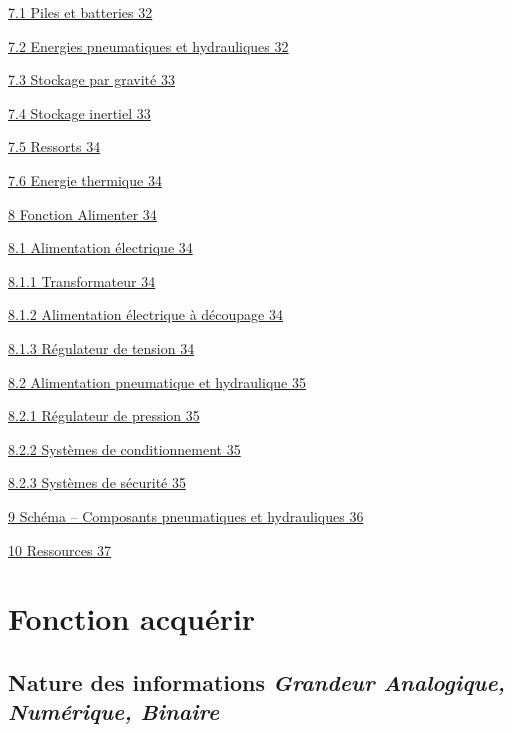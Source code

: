 \documentclass[
]{article}
\begin{document}
\protect\hyperlink{piles-et-batteries}{7.1 Piles et batteries 32}

\protect\hyperlink{energies-pneumatiques-et-hydrauliques}{7.2 Energies
pneumatiques et hydrauliques 32}

\protect\hyperlink{stockage-par-gravituxe9}{7.3 Stockage par gravité 33}

\protect\hyperlink{stockage-inertiel}{7.4 Stockage inertiel 33}

\protect\hyperlink{ressorts}{7.5 Ressorts 34}

\protect\hyperlink{energie-thermique}{7.6 Energie thermique 34}

\protect\hyperlink{fonction-alimenter}{8 Fonction Alimenter 34}

\protect\hyperlink{alimentation-uxe9lectrique}{8.1 Alimentation
électrique 34}

\protect\hyperlink{transformateur}{8.1.1 Transformateur 34}

\protect\hyperlink{alimentation-uxe9lectrique-uxe0-duxe9coupage}{8.1.2
Alimentation électrique à découpage 34}

\protect\hyperlink{ruxe9gulateur-de-tension}{8.1.3 Régulateur de tension
34}

\protect\hyperlink{alimentation-pneumatique-et-hydraulique}{8.2
Alimentation pneumatique et hydraulique 35}

\protect\hyperlink{ruxe9gulateur-de-pression}{8.2.1 Régulateur de
pression 35}

\protect\hyperlink{systuxe8mes-de-conditionnement}{8.2.2 Systèmes de
conditionnement 35}

\protect\hyperlink{systuxe8mes-de-suxe9curituxe9}{8.2.3 Systèmes de
sécurité 35}

\protect\hyperlink{schuxe9ma-composants-pneumatiques-et-hydrauliques}{9
Schéma -- Composants pneumatiques et hydrauliques 36}

\protect\hyperlink{ressources}{10 Ressources 37}

\hypertarget{fonction-acquuxe9rir}{%
\section{Fonction acquérir}\label{fonction-acquuxe9rir}}

\hypertarget{nature-des-informations-grandeur-analogique-numuxe9rique-binaire}{%
\subsection{\texorpdfstring{Nature des informations \emph{Grandeur
Analogique, Numérique,
Binaire}}{Nature des informations Grandeur Analogique, Numérique, Binaire}}\label{nature-des-informations-grandeur-analogique-numuxe9rique-binaire}}
\end{document}
